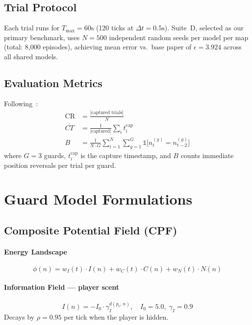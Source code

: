 \documentclass[conference,onecolumn]{IEEEtran}
\begin{document}
\subsection{Trial Protocol}
Each trial runs for $T_{\max} = 60\text{s}$ (120 ticks at
$\Delta t = 0.5\text{s}$). Suite~D, selected as our primary
benchmark, uses $N = 500$ independent random seeds per model per
map (total: 8,000 episodes), achieving mean error vs.\ base paper of
$\epsilon = 3.924$ across all shared models.

\subsection{Evaluation Metrics}
Following~\cite{xu2025}:
\begin{align}
  \text{CR} &= \frac{|\text{captured trials}|}{N} \\[4pt]
  \overline{CT} &= \frac{1}{|\text{captured}|} \sum_{i} t_i^{\text{cap}} \\[4pt]
  B &= \frac{1}{N \cdot G}
      \sum_{i=1}^{N} \sum_{g=1}^{G}
      \mathbb{1}\bigl[n_t^{(g)} = n_{t-2}^{(g)}\bigr]
\end{align}
where $G = 3$ guards, $t_i^{\text{cap}}$ is the capture timestamp,
and $B$ counts immediate position reversals per trial per guard.

\section{Guard Model Formulations}

\subsection{Composite Potential Field (CPF)~\cite{xu2025}}

\paragraph{Energy Landscape}
\begin{equation}
  \phi(n) = w_I(t)\cdot I(n) + w_C(t)\cdot C(n) + w_N(t)\cdot N(n)
\end{equation}

\paragraph{Information Field --- player scent}
\begin{equation}
  I(n) = -I_0 \cdot \gamma_I^{d(p_t,\, n)}, \quad
  I_0 = 5.0,\; \gamma_I = 0.9
\end{equation}
Decays by $\rho = 0.95$ per tick when the player is hidden.
\end{document}
